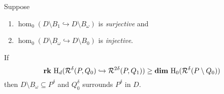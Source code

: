 \begin{frame}
  \begin{small}
  \begin{theorem}
    Suppose
    \begin{enumerate}
      \item $\hom_0(D\setminus B_{1}\hookrightarrow D\setminus B_\omega)$ is \emph{surjective} and
      \item $\hom_0(D\setminus B_\omega\hookrightarrow D\setminus B_{0})$ is \emph{injective}.
    \end{enumerate}

    If
    \[ \mathbf{rk}~\mathrm{H}_d(\mathcal{R}^\delta(P,Q_0)\hookrightarrow \mathcal{R}^{2\delta}(P, Q_1))\geq \mathbf{dim}~\mathrm{H}_0(\mathcal{R}^\delta(P\setminus Q_{0}))\]
    then $D\setminus B_\omega\subseteq P^\delta$ and $Q_0^\delta$ surrounds $P^\delta$ in $D$.
  \end{theorem}
  \end{small}

\end{frame}
